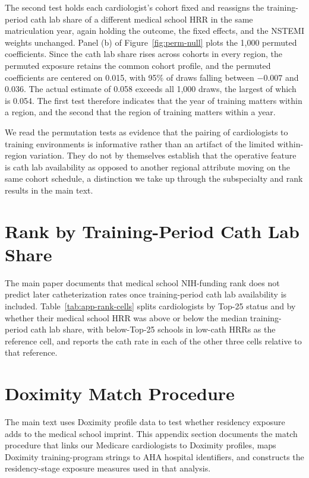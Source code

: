 \documentclass[12pt]{article}
\begin{document}
The second test holds each cardiologist's cohort fixed and reassigns the training-period cath lab share of a different medical school HRR in the same matriculation year, again holding the outcome, the fixed effects, and the NSTEMI weights unchanged. Panel (b) of Figure~\ref{fig:perm-null} plots the 1,000 permuted coefficients. Since the cath lab share rises across cohorts in every region, the permuted exposure retains the common cohort profile, and the permuted coefficients are centered on 0.015, with 95\% of draws falling between $-0.007$ and 0.036. The actual estimate of 0.058 exceeds all 1,000 draws, the largest of which is 0.054. The first test therefore indicates that the year of training matters within a region, and the second that the region of training matters within a year.

We read the permutation tests as evidence that the pairing of cardiologists to training environments is informative rather than an artifact of the limited within-region variation. They do not by themselves establish that the operative feature is cath lab availability as opposed to another regional attribute moving on the same cohort schedule, a distinction we take up through the subspecialty and rank results in the main text.

\section{Rank by Training-Period Cath Lab Share}\label{sec:app-rank}

The main paper documents that medical school NIH-funding rank does not predict later catheterization rates once training-period cath lab availability is included. Table~\ref{tab:app-rank-cells} splits cardiologists by Top-25 status and by whether their medical school HRR was above or below the median training-period cath lab share, with below-Top-25 schools in low-cath HRRs as the reference cell, and reports the cath rate in each of the other three cells relative to that reference.

\section{Doximity Match Procedure}\label{sec:app-doximity}

The main text uses Doximity profile data to test whether residency exposure adds to the medical school imprint. This appendix section documents the match procedure that links our Medicare cardiologists to Doximity profiles, maps Doximity training-program strings to AHA hospital identifiers, and constructs the residency-stage exposure measures used in that analysis.
\end{document}
